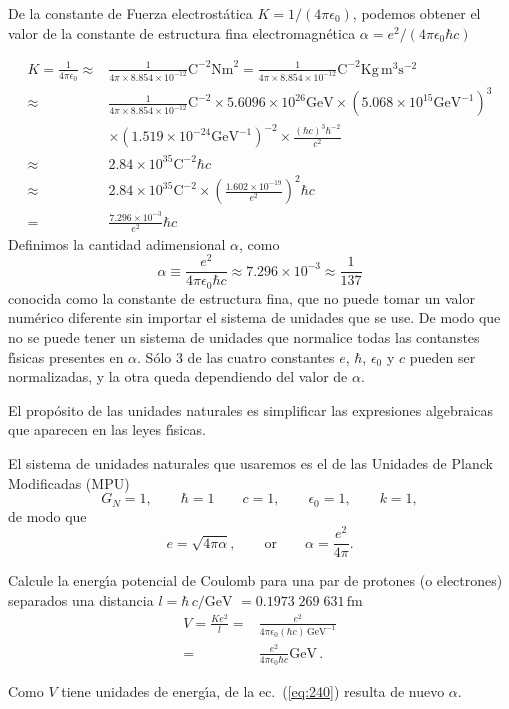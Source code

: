 \begin{frame}
De la constante de Fuerza electrost\'atica $K=1/(4\pi\epsilon_0)$, podemos obtener el valor de la constante de estructura fina electromagn\'etica $\alpha=e^2/(4\pi\epsilon_0\hbar c)$

\begin{align*}
  K=\frac{1}{4\pi\epsilon_0}\approx&\frac{1}{4\pi\times8.854\times10^{-12}}\text{C}^{-2}\text{Nm}^2
  =\frac{1}{4\pi\times8.854\times10^{-12}}\text{C}^{-2}\text{Kg}\,\text{m}^3\text{s}^{-2}\\
  \approx&\frac{1}{4\pi\times8.854\times10^{-12}}\text{C}^{-2}\times5.6096\times10^{26}\text{GeV}
  \times(5.068\times10^{15}\text{GeV}^{-1})^3\\
  &\times(1.519\times10^{-24}\text{GeV}^{-1})^{-2}\times\frac{(\hbar c)^3\hbar^{-2}}{c^2}\\
  \approx&2.84\times10^{35}\text{C}^{-2}\hbar c\\
  \approx&2.84\times10^{35}\text{C}^{-2}\times
  \left(
    \frac{1.602\times10^{-19}}{e^2}
  \right)^2\hbar c\\
  =&\frac{7.296\times10^{-3}}{e^2}\hbar c
\end{align*}
Definimos la cantidad adimensional $\alpha$, como
\begin{equation*}
  \alpha\equiv\frac{e^2}{4\pi\epsilon_0\hbar c}
\approx7.296\times10^{-3}\approx\frac{1}{137}
\end{equation*}
conocida como la constante de estructura fina, que no puede tomar un
valor num\'erico diferente sin importar el sistema de unidades que se
use. De modo que no se puede tener un sistema de unidades que
normalice todas las contanstes f\'\i sicas presentes en
$\alpha$. S\'olo 3 de las cuatro constantes $e$, $\hbar$, $\epsilon_0$
y $c$ pueden ser normalizadas, y la otra queda dependiendo del valor
de $\alpha$.

El prop\'osito de las unidades naturales es simplificar las expresiones algebraicas que aparecen en las leyes f\'\i sicas. 

El sistema de unidades naturales que usaremos es el de las Unidades de Planck Modificadas (MPU)
\begin{equation}
  G_N=1,\qquad \hbar=1 \qquad c=1,\qquad \epsilon_0=1,\qquad k=1,
\end{equation}
de modo que
\begin{equation}
  e=\sqrt{4\pi\alpha},\qquad\text{or}\qquad \alpha=\frac{e^2}{4\pi}.
\end{equation}
  

\begin{example}
  Calcule la energ\'\i a potencial de Coulomb para una par de protones (o electrones) separados una distancia $l=\hbar\,c/\text{GeV}$ $=0.1973\;269\;631\,\text{fm}$
  \begin{align}
    \label{eq:240}
    V=\frac{K e^2}{l}=&\frac{e^2}{4\pi\epsilon_0(\hbar c)\,\text{GeV}^{-1}}\nonumber\\
    =&\frac{e^2}{4\pi\epsilon_0\hbar c}\text{GeV}\,.
  \end{align}
\end{example}
Como $V$ tiene unidades de energ\'\i a, de la ec.~(\ref{eq:240})  resulta de nuevo $\alpha$.
\end{frame}

